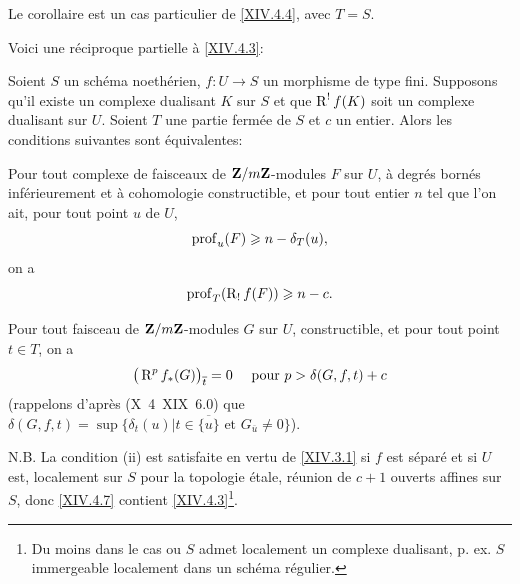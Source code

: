 Le corollaire est un cas particulier de \ref{XIV.4.4}, avec $T=S$.

Voici une r\'eciproque partielle \`a \ref{XIV.4.3}:

\begin{proposition} \label{XIV.4.7}
Soient $S$ un sch\'ema noeth\'erien, $f\colon U\to S$ un morphisme de type fini. Supposons qu'il existe un complexe dualisant $K$ sur $S$ et que $\operatorname{R}^{!}f(K)$ soit un complexe dualisant sur $U$. Soient $T$ une partie ferm\'ee de $S$ et $c$ un entier. Alors les conditions suivantes sont \'equivalentes:
\begin{enumeratei}
\item
Pour tout complexe de faisceaux de $\mathbf{Z}/m\mathbf{Z}$-modules $F$ sur $U$, \`a degr\'es born\'es inf\'erieurement et \`a cohomologie constructible, et pour tout entier $n$ tel que l'on ait, pour tout point $u$ de $U$,
$$
\operatorname{prof}_{u}(F)\geqslant n-\delta_{T}(u),
$$
on a
$$
\operatorname{prof}_{T}(\operatorname{R}_{!}f(F))\geqslant n-c.
$$

\item
Pour tout faisceau de $\mathbf{Z}/m\mathbf{Z}$-modules $G$ sur $U$, constructible, et pour tout point $t\in T$, on a
$$
\big(\operatorname{R}^{p}f_{\ast}(G)\big)_{\overline{t}}=0\quad\textrm{ pour }p>\delta(G, f, t)+c$$
(rappelons d'apr\`es (\textup{\SGA X~4~XIX~6.0}) que $\delta(G, f, t)=\sup\{ \delta_{t}(u)|t\in\overline{\{ u\} }\textrm{ et }G_{\overline{u}}\neq 0\}$).
\end{enumeratei}
\end{proposition}

N.B. La condition \textup{(ii)} est satisfaite en vertu de \ref{XIV.3.1} si $f$ est s\'epar\'e et si $U$ est, localement sur $S$ pour la topologie \'etale, r\'eunion de $c+1$ ouverts affines sur $S$, donc \ref{XIV.4.7} contient \ref{XIV.4.3}\footnote{Du moins dans le cas ou $S$ admet localement un complexe dualisant, p. ex. $S$ immergeable localement dans un sch\'ema r\'egulier.}.

